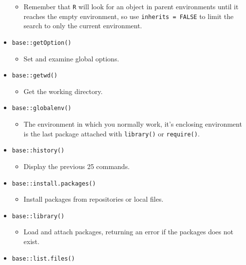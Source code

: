 \documentclass[
]{book}
\providecommand{\tightlist}{%
  \setlength{\itemsep}{0pt}\setlength{\parskip}{0pt}}
\begin{document}
\begin{itemize}
  \begin{itemize}
  \tightlist
  \item
    Remember that \texttt{R} will look for an object in parent environments until it reaches the empty environment, so use \texttt{inherits\ =\ FALSE} to limit the search to only the current environment.
  \end{itemize}
\item
  \texttt{base::getOption()}

  \begin{itemize}
  \tightlist
  \item
    Set and examine global options.
  \end{itemize}
\item
  \texttt{base::getwd()}

  \begin{itemize}
  \tightlist
  \item
    Get the working directory.
  \end{itemize}
\item
  \texttt{base::globalenv()}

  \begin{itemize}
  \tightlist
  \item
    The environment in which you normally work, it's enclosing environment is the last package attached with \texttt{library()} or \texttt{require()}.
  \end{itemize}
\item
  \texttt{base::history()}

  \begin{itemize}
  \tightlist
  \item
    Display the previous 25 commands.
  \end{itemize}
\item
  \texttt{base::install.packages()}

  \begin{itemize}
  \tightlist
  \item
    Install packages from repositories or local files.
  \end{itemize}
\item
  \texttt{base::library()}

  \begin{itemize}
  \tightlist
  \item
    Load and attach packages, returning an error if the packages does not exist.
  \end{itemize}
\item
  \texttt{base::list.files()}


\end{itemize}
\end{document}
